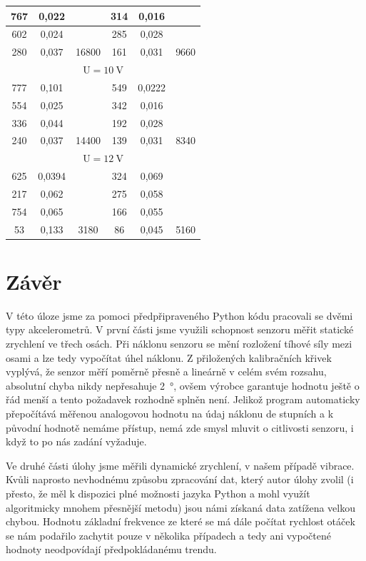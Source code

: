 \documentclass{protokol}
\begin{document}
\begin{table}[ht!]
\begin{tabular}{|c|c|c|c|c|c|}
            \hline 767 & 0,022 &      & 314 & 0,016 & \\
            \hline 602 & 0,024 &      & 285 & 0,028 & \\
            \hline 280 & 0,037 & 16800  & 161 & 0,031 & 9660 \\
            \hline \multicolumn{6}{|c|}{$\mathrm{U}=10 \mathrm{~V}$} \\
            \hline 777 & 0,101 &  & 549 & 0,0222 &  \\
            \hline 554 & 0,025 &      & 342 & 0,016 & \\
            \hline 336 & 0,044 &      & 192 & 0,028 & \\
            \hline 240 & 0,037 & 14400  & 139 & 0,031 & 8340 \\
            \hline \multicolumn{6}{|c|}{$\mathrm{U}=12 \mathrm{~V}$} \\
            \hline 625 & 0,0394 & & 324 & 0,069 &  \\
            \hline 217 & 0,062 &      & 275 & 0,058 & \\
            \hline 754 & 0,065 &      & 166 & 0,055 & \\
            \hline 53  & 0,133 & 3180  & 86  & 0,045 & 5160 \\
            \hline
            \end{tabular}
    
    \end{table}

        
        \clearpage
        \section*{Závěr}
            V této úloze jsme za pomoci předpřipraveného Python kódu pracovali se dvěmi typy akcelerometrů. V první části jsme využili schopnost senzoru měřit statické zrychlení ve třech osách. Při náklonu senzoru se mění rozložení tíhové síly mezi osami a lze tedy vypočítat úhel náklonu. Z přiložených kalibračních křivek vyplývá, že senzor měří poměrně přesně a lineárně v celém svém rozsahu, absolutní chyba nikdy nepřesahuje \qty{2}{\degree}, ovšem výrobce garantuje hodnotu ještě o řád menší a tento požadavek rozhodně splněn není.  Jelikož program automaticky přepočítává měřenou analogovou hodnotu na údaj náklonu de stupních a k původní hodnotě nemáme přístup, nemá zde smysl mluvit o citlivosti senzoru, i když to po nás zadání vyžaduje. 

            Ve druhé části úlohy jsme měřili dynamické zrychlení, v našem případě vibrace. Kvůli naprosto nevhodnému způsobu zpracování dat, který autor úlohy zvolil (i přesto, že měl k dispozici plné možnosti jazyka Python a mohl využít algoritmicky mnohem přesnější metodu) jsou námi získaná data zatížena velkou chybou. Hodnotu základní frekvence ze které se má dále počítat rychlost otáček se nám podařilo zachytit pouze v několika případech a tedy ani vypočtené hodnoty neodpovídají předpokládanému trendu. 
\end{document}
